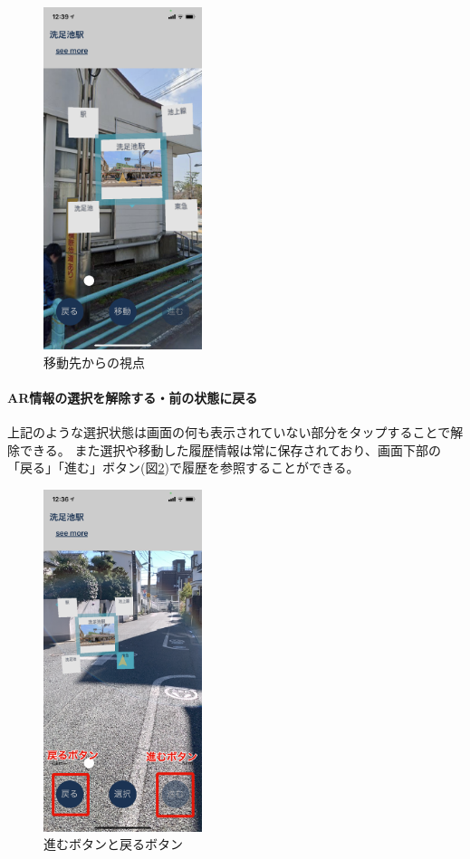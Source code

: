 \begin{figure}[h]
  \centering
  \includegraphics[height=100mm]{images/hypar_touch_moved.png}
  \caption{移動先からの視点} \label{fig:hypar_touch_moved}
\end{figure}

\paragraph*{AR情報の選択を解除する・前の状態に戻る}
上記のような選択状態は画面の何も表示されていない部分をタップすることで解除できる。
また選択や移動した履歴情報は常に保存されており、画面下部の「戻る」「進む」ボタン(図\ref{fig:hypar_touch_history_button})で履歴を参照することができる。

\begin{figure}[h]
  \centering
  \includegraphics[height=100mm]{images/hypar_touch_history_button.png}
  \caption{進むボタンと戻るボタン} \label{fig:hypar_touch_history_button}
\end{figure}

